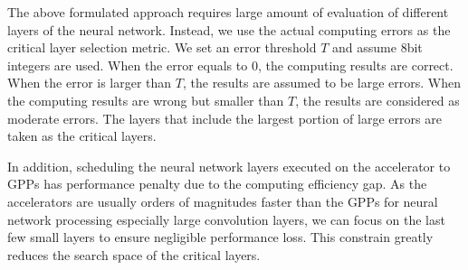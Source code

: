 The above formulated approach requires large amount of evaluation of 
different layers of the neural network. Instead, we use the actual 
computing errors as the critical layer selection metric. We set an 
error threshold $T$ and assume 8bit integers are used. 
When the error equals to 0, the computing results are correct. 
When the error is larger than $T$, the results are assumed to be large errors.
When the computing results are wrong but smaller than $T$, the results are considered 
as moderate errors. The layers that include the largest portion of large errors 
are taken as the critical layers.

In addition, scheduling the neural network layers executed 
on the accelerator to GPPs has performance penalty due to the 
computing efficiency gap. As the accelerators are usually 
orders of magnitudes faster than the GPPs for neural network 
processing especially large convolution layers, we can focus on 
the last few small layers to ensure negligible performance 
loss. This constrain greatly reduces the search space
of the critical layers. 


